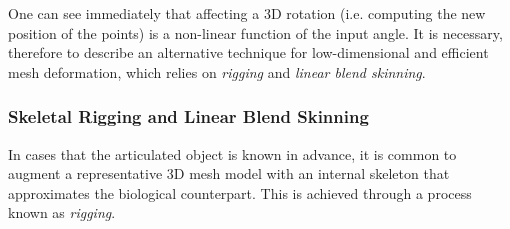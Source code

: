 One can see immediately that affecting a 3D rotation (i.e. computing the new position of the points) is a non-linear function of the input angle. It is necessary, therefore to describe an alternative technique for low-dimensional and efficient mesh deformation, which relies on \emph{rigging} and \emph{linear blend skinning}. 


\subsubsection{Skeletal Rigging and Linear Blend Skinning}

In cases that the articulated object is known in advance, it is common to augment a representative 3D mesh model with an internal skeleton that approximates the biological counterpart. This is achieved through a process known as \emph{rigging}.  


